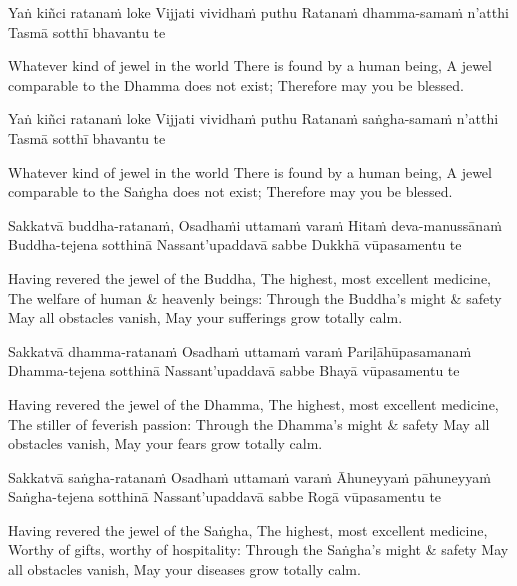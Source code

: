 Yaṅ kiñci ratanaṁ loke
Vijjati vividhaṁ puthu
Ratanaṁ dhamma-samaṁ n’atthi
Tasmā sotthī bhavantu te

\begin{english}
  Whatever kind of jewel in the world
  There is found by a human being,
  A jewel comparable to the Dhamma does not exist;
  Therefore may you be blessed.
\end{english}

Yaṅ kiñci ratanaṁ loke
Vijjati vividhaṁ puthu
Ratanaṁ saṅgha-samaṁ n’atthi
Tasmā sotthī bhavantu te

\begin{english}
  Whatever kind of jewel in the world
  There is found by a human being,
  A jewel comparable to the Saṅgha does not exist;
  Therefore may you be blessed.
\end{english}

Sakkatvā buddha-ratanaṁ,
Osadhaṁi uttamaṁ varaṁ
Hitaṁ deva-manussānaṁ
Buddha-tejena sotthinā
Nassant’upaddavā sabbe
Dukkhā vūpasamentu te

\begin{english}
  Having revered the jewel of the Buddha,
  The highest, most excellent medicine,
  The welfare of human \& heavenly beings:
  Through the Buddha’s might \& safety
  May all obstacles vanish,
  May your sufferings grow totally calm.
\end{english}

Sakkatvā dhamma-ratanaṁ
Osadhaṁ uttamaṁ varaṁ
Pariḷāhūpasamanaṁ
Dhamma-tejena sotthinā
Nassant’upaddavā sabbe
Bhayā vūpasamentu te

\begin{english}
  Having revered the jewel of the Dhamma,
  The highest, most excellent medicine,
  The stiller of feverish passion:
  Through the Dhamma’s might \& safety
  May all obstacles vanish,
  May your fears grow totally calm.
\end{english}

Sakkatvā saṅgha-ratanaṁ
Osadhaṁ uttamaṁ varaṁ
Āhuneyyaṁ pāhuneyyaṁ
Saṅgha-tejena sotthinā
Nassant’upaddavā sabbe
Rogā vūpasamentu te

\begin{english}
  Having revered the jewel of the Saṅgha,
  The highest, most excellent medicine,
  Worthy of gifts, worthy of hospitality:
  Through the Saṅgha’s might \& safety
  May all obstacles vanish,
  May your diseases grow totally calm.
\end{english}

\suttaRef{[MJG]}

